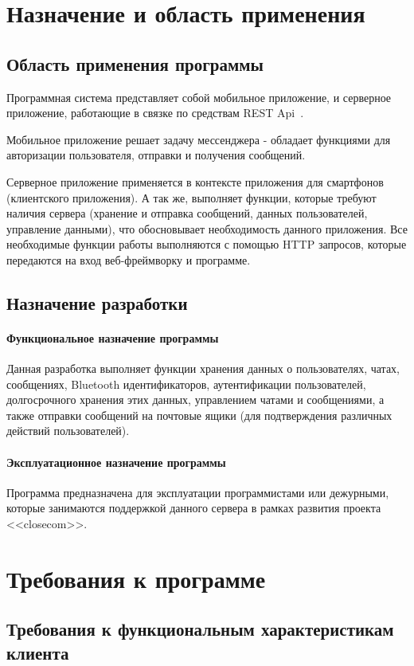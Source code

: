\documentclass[explnote]{espd}
\begin{document}
\section{Назначение и область применения}
\subsection{Область применения программы}
Программная система представляет собой мобильное приложение, и серверное приложение, работающие в связке по средствам REST Api~\cite{rest}.

Мобильное приложение решает задачу мессенджера - обладает функциями для авторизации пользователя, отправки и получения сообщений.

Серверное приложение применяется в контексте приложения для смартфонов (клиентского приложения). А так же, выполняет функции, которые требуют наличия сервера (хранение и отправка сообщений, данных пользователей, управление данными), что обосновывает необходимость данного приложения. Все необходимые функции работы выполняются с помощью HTTP запросов, которые передаются на вход веб-фреймворку и программе.

\subsection{Назначение разработки}
\paragraph{Функциональное назначение программы}
Данная разработка выполняет функции хранения данных о пользователях, чатах, сообщениях, Bluetooth идентификаторов, аутентификации пользователей, долгосрочного хранения этих данных, управлением чатами и сообщениями, а также отправки сообщений на почтовые ящики (для подтверждения различных действий пользователей).

\paragraph{Эксплуатационное назначение программы}
Программа предназначена для эксплуатации программистами или дежурными, которые занимаются поддержкой данного сервера в рамках развития проекта <<closecom>>.

\section{Требования к программе}
\subsection{Требования к функциональным характеристикам клиента}
\end{document}
